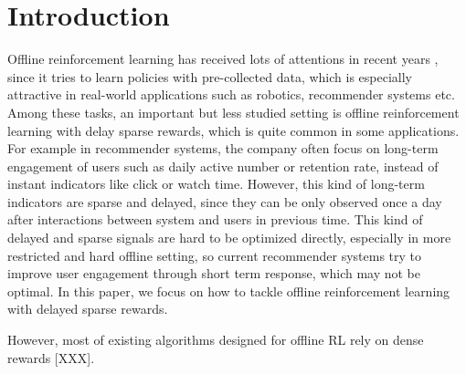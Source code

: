 \section{Introduction}

Offline reinforcement learning has received lots of attentions in recent years \cite{levine2020offline}, since it tries to learn policies with pre-collected data, which is especially attractive in real-world applications such as robotics, recommender systems etc. Among these tasks, an important but less studied setting is offline reinforcement learning with delay sparse rewards, which is quite common in some applications. For example in recommender systems,  the company often focus on long-term engagement of users such as daily active number or retention rate, instead of instant indicators like click or watch time. However, this kind of long-term indicators are sparse and delayed, since they can be only observed once a day after interactions between system and users in previous time. This kind of delayed and sparse signals are hard to be optimized directly, especially in more restricted and hard offline setting, so current recommender systems try to improve user engagement through short term response, which may not be optimal. In this paper, we focus on how to tackle offline reinforcement learning with delayed sparse rewards. 

However, most of existing algorithms designed for offline RL rely on dense rewards [XXX].  


